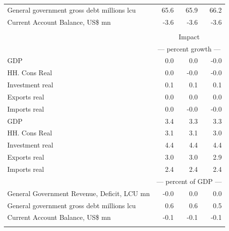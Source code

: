 \documentclass{article}
\begin{document}
\begin{table}[ht]
\begin{tabular}{lrrr}
General government gross debt millions lcu & 65.6 & 65.9 & 66.2 \\
Current Account Balance, US\$ mn & -3.6 & -3.6 & -3.6 \\
&\multicolumn{3}{c}{  }       \\
&\multicolumn{3}{c}{Impact}       \\
&\multicolumn{3}{c}{--- percent growth ---}       \\
GDP & 0.0 & 0.0 & -0.0 \\
HH. Cons Real & 0.0 & -0.0 & -0.0 \\
Investment real & 0.1 & 0.1 & 0.1 \\
Exports real & 0.0 & 0.0 & 0.0 \\
Imports real & 0.0 & -0.0 & -0.0 \\
GDP & 3.4 & 3.3 & 3.3 \\
HH. Cons Real & 3.1 & 3.1 & 3.0 \\
Investment real & 4.4 & 4.4 & 4.4 \\
Exports real & 3.0 & 3.0 & 2.9 \\
Imports real & 2.4 & 2.4 & 2.4 \\
&\multicolumn{3}{c}{--- percent of GDP ---}       \\
General Government Revenue, Deficit, LCU mn & -0.0 & 0.0 & 0.0 \\
General government gross debt millions lcu & 0.6 & 0.6 & 0.5 \\
Current Account Balance, US\$ mn & -0.1 & -0.1 & -0.1 \\
&\multicolumn{3}{c}{  }       \\
\bottomrule
\end{tabular}
\end{table}
\end{document}
